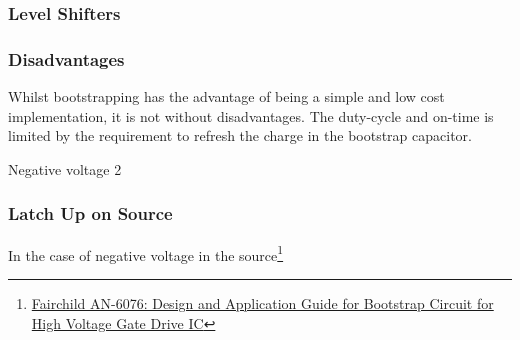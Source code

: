 \subsubsection{Level Shifters}

\subsubsection{Disadvantages}
Whilst bootstrapping has the advantage of being a simple and low cost
implementation, it is not without disadvantages. The duty-cycle and on-time is
limited by the requirement to refresh the charge in the bootstrap capacitor.

Negative voltage 2

\subsubsection{Latch Up on Source}
In the case of negative voltage in the
source\footnote{\href{https://www.fairchildsemi.com/application-notes/AN/AN-6076.pdf}{Fairchild
AN-6076: Design and Application Guide for Bootstrap Circuit for High Voltage
Gate Drive IC}}

